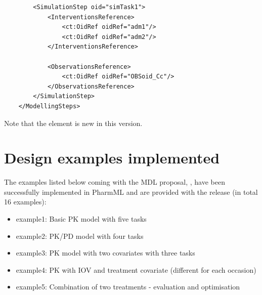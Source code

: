\begin{example}
\begin{lstlisting}
        <SimulationStep oid="simTask1">
            <InterventionsReference>
                <ct:OidRef oidRef="adm1"/>
                <ct:OidRef oidRef="adm2"/>
            </InterventionsReference>
            
            <ObservationsReference>
                <ct:OidRef oidRef="OBSoid_Cc"/>
            </ObservationsReference>
        </SimulationStep>
    </ModellingSteps>
\end{lstlisting}
Note that the  element is new in this version.
\end{example}

\section{Design examples implemented}
\label{sec:designExamples}
The examples listed below coming with the MDL proposal, \cite{CommetsExamples2015},
have been successfully implemented in PharmML and are provided with the release 
(in total 16 examples):

\begin{itemize}
\item 
example1: Basic PK model with five tasks
\item 
example2: PK/PD model with four tasks
\item 
example3: PK model with two covariates with three tasks
\item 
example4: PK with IOV and treatment covariate (different for each occasion)
\item 
example5: Combination of two treatments - evaluation and optimisation
\end{itemize}



